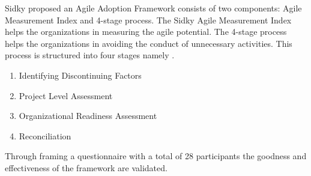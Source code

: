 \documentclass[a4paper,oneside]{bth}
\begin{document}
Sidky proposed an Agile Adoption Framework consists of two components: Agile Measurement Index and 4-stage process. The Sidky Agile Measurement Index helps the organizations in measuring the agile potential. The 4-stage process helps the organizations in avoiding the conduct of unnecessary activities. This process is structured into four stages namely \cite{sidky_structured_2007}.
\begin{center}
\begin{enumerate}
\item Identifying Discontinuing Factors
\item Project Level Assessment
\item Organizational Readiness Assessment
\item Reconciliation
\end{enumerate}
\end{center}
Through framing a questionnaire with a total of 28 participants the goodness and effectiveness of the framework are validated.
\end{document}
